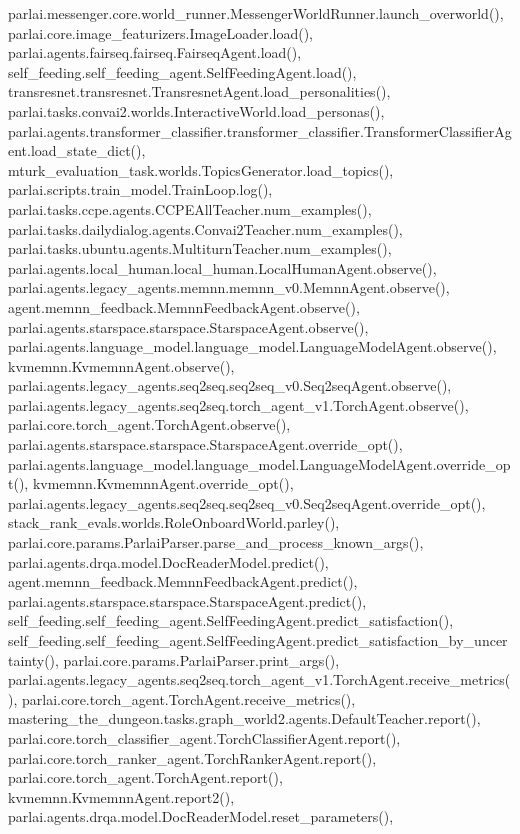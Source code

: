 parlai.\+messenger.\+core.\+world\+\_\+runner.\+Messenger\+World\+Runner.\+launch\+\_\+overworld(), parlai.\+core.\+image\+\_\+featurizers.\+Image\+Loader.\+load(), parlai.\+agents.\+fairseq.\+fairseq.\+Fairseq\+Agent.\+load(), self\+\_\+feeding.\+self\+\_\+feeding\+\_\+agent.\+Self\+Feeding\+Agent.\+load(), transresnet.\+transresnet.\+Transresnet\+Agent.\+load\+\_\+personalities(), parlai.\+tasks.\+convai2.\+worlds.\+Interactive\+World.\+load\+\_\+personas(), parlai.\+agents.\+transformer\+\_\+classifier.\+transformer\+\_\+classifier.\+Transformer\+Classifier\+Agent.\+load\+\_\+state\+\_\+dict(), mturk\+\_\+evaluation\+\_\+task.\+worlds.\+Topics\+Generator.\+load\+\_\+topics(), parlai.\+scripts.\+train\+\_\+model.\+Train\+Loop.\+log(), parlai.\+tasks.\+ccpe.\+agents.\+C\+C\+P\+E\+All\+Teacher.\+num\+\_\+examples(), parlai.\+tasks.\+dailydialog.\+agents.\+Convai2\+Teacher.\+num\+\_\+examples(), parlai.\+tasks.\+ubuntu.\+agents.\+Multiturn\+Teacher.\+num\+\_\+examples(), parlai.\+agents.\+local\+\_\+human.\+local\+\_\+human.\+Local\+Human\+Agent.\+observe(), parlai.\+agents.\+legacy\+\_\+agents.\+memnn.\+memnn\+\_\+v0.\+Memnn\+Agent.\+observe(), agent.\+memnn\+\_\+feedback.\+Memnn\+Feedback\+Agent.\+observe(), parlai.\+agents.\+starspace.\+starspace.\+Starspace\+Agent.\+observe(), parlai.\+agents.\+language\+\_\+model.\+language\+\_\+model.\+Language\+Model\+Agent.\+observe(), kvmemnn.\+Kvmemnn\+Agent.\+observe(), parlai.\+agents.\+legacy\+\_\+agents.\+seq2seq.\+seq2seq\+\_\+v0.\+Seq2seq\+Agent.\+observe(), parlai.\+agents.\+legacy\+\_\+agents.\+seq2seq.\+torch\+\_\+agent\+\_\+v1.\+Torch\+Agent.\+observe(), parlai.\+core.\+torch\+\_\+agent.\+Torch\+Agent.\+observe(), parlai.\+agents.\+starspace.\+starspace.\+Starspace\+Agent.\+override\+\_\+opt(), parlai.\+agents.\+language\+\_\+model.\+language\+\_\+model.\+Language\+Model\+Agent.\+override\+\_\+opt(), kvmemnn.\+Kvmemnn\+Agent.\+override\+\_\+opt(), parlai.\+agents.\+legacy\+\_\+agents.\+seq2seq.\+seq2seq\+\_\+v0.\+Seq2seq\+Agent.\+override\+\_\+opt(), stack\+\_\+rank\+\_\+evals.\+worlds.\+Role\+Onboard\+World.\+parley(), parlai.\+core.\+params.\+Parlai\+Parser.\+parse\+\_\+and\+\_\+process\+\_\+known\+\_\+args(), parlai.\+agents.\+drqa.\+model.\+Doc\+Reader\+Model.\+predict(), agent.\+memnn\+\_\+feedback.\+Memnn\+Feedback\+Agent.\+predict(), parlai.\+agents.\+starspace.\+starspace.\+Starspace\+Agent.\+predict(), self\+\_\+feeding.\+self\+\_\+feeding\+\_\+agent.\+Self\+Feeding\+Agent.\+predict\+\_\+satisfaction(), self\+\_\+feeding.\+self\+\_\+feeding\+\_\+agent.\+Self\+Feeding\+Agent.\+predict\+\_\+satisfaction\+\_\+by\+\_\+uncertainty(), parlai.\+core.\+params.\+Parlai\+Parser.\+print\+\_\+args(), parlai.\+agents.\+legacy\+\_\+agents.\+seq2seq.\+torch\+\_\+agent\+\_\+v1.\+Torch\+Agent.\+receive\+\_\+metrics(), parlai.\+core.\+torch\+\_\+agent.\+Torch\+Agent.\+receive\+\_\+metrics(), mastering\+\_\+the\+\_\+dungeon.\+tasks.\+graph\+\_\+world2.\+agents.\+Default\+Teacher.\+report(), parlai.\+core.\+torch\+\_\+classifier\+\_\+agent.\+Torch\+Classifier\+Agent.\+report(), parlai.\+core.\+torch\+\_\+ranker\+\_\+agent.\+Torch\+Ranker\+Agent.\+report(), parlai.\+core.\+torch\+\_\+agent.\+Torch\+Agent.\+report(), kvmemnn.\+Kvmemnn\+Agent.\+report2(), parlai.\+agents.\+drqa.\+model.\+Doc\+Reader\+Model.\+reset\+\_\+parameters(), 